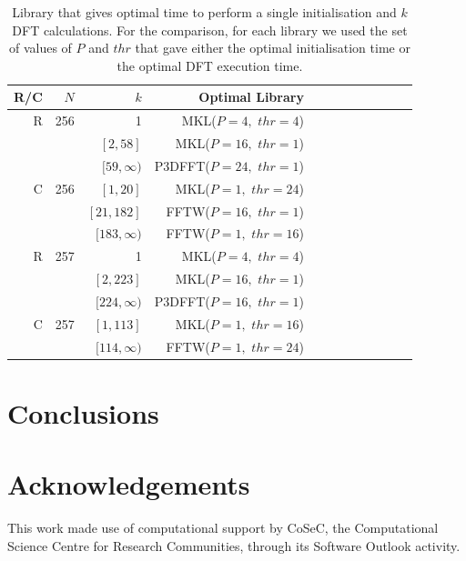 \documentclass[a4paper]{article}
\begin{document}
 \begin{table}[!htbp]
\begin{center}
\begin{tabular}{|r|r|r|r|r|r||r|r|r|r|r|r|}\hline
R/C & $N$ & $k$ & Optimal Library \\ \hline
R & 256 & 1 & MKL($P=4,$ $thr=4$) \\
  &     & $[2,58]$ & MKL($P=16,$ $thr=1$) \\
  &     & $[59,\infty)$ & P3DFFT($P=24,$ $thr=1$) \\\hline
C & 256 & $[1,20]$ & MKL($P=1,$ $thr=24$) \\
  &     & $[21,182]$ & FFTW($P=16,$ $thr=1$) \\
  &     & $[183,\infty)$ & FFTW($P=1,$ $thr=16$) \\\hline
R & 257 & 1 & MKL($P=4,$ $thr=4$) \\
  &     & $[2,223]$ & MKL($P=16,$ $thr=1$) \\
  &     & $[224,\infty)$ & P3DFFT($P=16,$ $thr=1$) \\\hline
C & 257 & $[1,113]$ & MKL($P=1,$ $thr=16$) \\
  &     & $[114,\infty)$ & FFTW($P=1,$ $thr=24$) \\\hline
\end{tabular}
\caption{ Library that gives optimal time to perform a single initialisation and $k$ DFT calculations. For the comparison, for each library we used the set of values of $P$ and $thr$ that gave either the optimal initialisation time or the optimal DFT execution time.  }\label{Tbl:3DCompk}
\end{center}
\end{table}

 

\section{Conclusions}\label{Sec:Conclusions}


\section*{Acknowledgements}
This work made use of computational support by CoSeC, the
Computational Science Centre for Research Communities, through its
Software Outlook activity.




\clearpage
\end{document}
